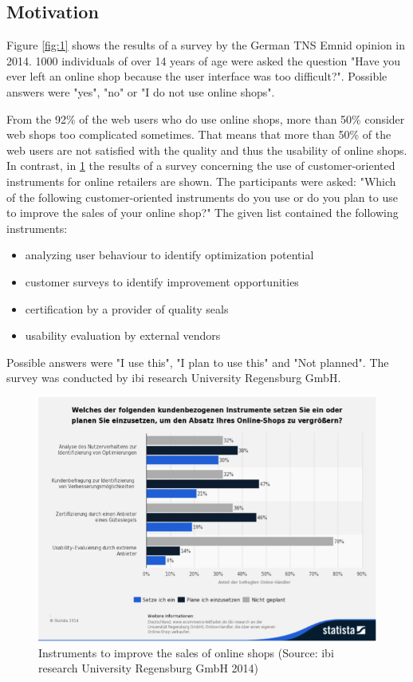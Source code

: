 \documentclass[output=paper]{langsci/langscibook}
\begin{document}
\subsection{Motivation}

Figure \ref{fig:1} shows the results of a survey by the German TNS Emnid opinion in 2014. 1000 individuals of over 14 years of age were asked the question "Have you ever left an online shop because the user interface was too difficult?". Possible answers were "yes", "no" or "I do not use online shops".


From the 92\% of the web users who do use online shops, more than 50\% consider web shops too complicated sometimes. That means that more than 50\% of the web users are not satisfied with the quality and thus the usability of online shops. In contrast, in \ref{fig:2} the results of a survey concerning the use of customer-oriented instruments for online retailers are shown. The participants were asked: "Which of the following customer-oriented instruments do you use or do you plan to use to improve the sales of your online shop?" The given list contained the following instruments:


\begin{itemize}
\item analyzing user behaviour to identify optimization potential 
\item customer surveys to identify improvement opportunities 
\item certification by a provider of quality seals 
\item usability evaluation by external vendors 
\end{itemize}

Possible answers were "I use this", "I plan to use this" and "Not planned". The survey was conducted by ibi research University Regensburg GmbH. 

\begin{figure}
 \includegraphics[width=\textwidth]{figures/Roesener2.png}
 \caption{Instruments to improve the sales of online shops (Source: ibi research University Regensburg GmbH 2014)}
 \label{fig:2}
\end{figure} 
\end{document}
